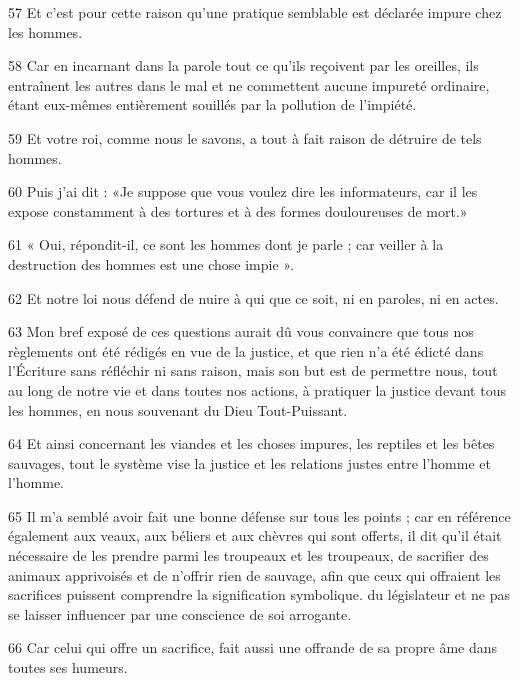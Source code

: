 \par 57 Et c'est pour cette raison qu'une pratique semblable est déclarée impure chez les hommes.

\par 58 Car en incarnant dans la parole tout ce qu'ils reçoivent par les oreilles, ils entraînent les autres dans le mal et ne commettent aucune impureté ordinaire, étant eux-mêmes entièrement souillés par la pollution de l'impiété.

\par 59 Et votre roi, comme nous le savons, a tout à fait raison de détruire de tels hommes.

\par 60 Puis j'ai dit : «Je suppose que vous voulez dire les informateurs, car il les expose constamment à des tortures et à des formes douloureuses de mort.»

\par 61 « Oui, répondit-il, ce sont les hommes dont je parle ; car veiller à la destruction des hommes est une chose impie ».

\par 62 Et notre loi nous défend de nuire à qui que ce soit, ni en paroles, ni en actes.

\par 63 Mon bref exposé de ces questions aurait dû vous convaincre que tous nos règlements ont été rédigés en vue de la justice, et que rien n'a été édicté dans l'Écriture sans réfléchir ni sans raison, mais son but est de permettre nous, tout au long de notre vie et dans toutes nos actions, à pratiquer la justice devant tous les hommes, en nous souvenant du Dieu Tout-Puissant.

\par 64 Et ainsi concernant les viandes et les choses impures, les reptiles et les bêtes sauvages, tout le système vise la justice et les relations justes entre l'homme et l'homme.

\par 65 Il m'a semblé avoir fait une bonne défense sur tous les points ; car en référence également aux veaux, aux béliers et aux chèvres qui sont offerts, il dit qu'il était nécessaire de les prendre parmi les troupeaux et les troupeaux, de sacrifier des animaux apprivoisés et de n'offrir rien de sauvage, afin que ceux qui offraient les sacrifices puissent comprendre la signification symbolique. du législateur et ne pas se laisser influencer par une conscience de soi arrogante.

\par 66 Car celui qui offre un sacrifice, fait aussi une offrande de sa propre âme dans toutes ses humeurs.

